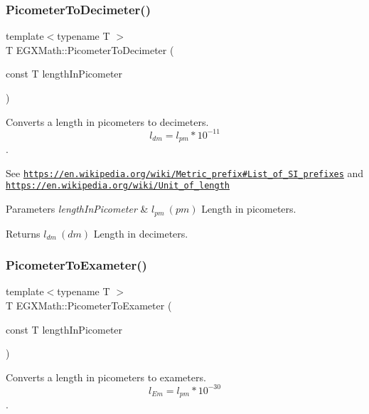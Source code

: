 \subsubsection{\texorpdfstring{Picometer\+To\+Decimeter()}{PicometerToDecimeter()}}
{\footnotesize\ttfamily template$<$typename T $>$ \\
T E\+G\+X\+Math\+::\+Picometer\+To\+Decimeter (\begin{DoxyParamCaption}\item[{const T}]{length\+In\+Picometer }\end{DoxyParamCaption})}



Converts a length in picometers to decimeters. \[ l_{dm}=l_{pm} * 10^{-11} \]. 

See \href{https://en.wikipedia.org/wiki/Metric_prefix#List_of_SI_prefixes}{\tt https\+://en.\+wikipedia.\+org/wiki/\+Metric\+\_\+prefix\#\+List\+\_\+of\+\_\+\+S\+I\+\_\+prefixes} and \href{https://en.wikipedia.org/wiki/Unit_of_length}{\tt https\+://en.\+wikipedia.\+org/wiki/\+Unit\+\_\+of\+\_\+length} 
\begin{DoxyParams}{Parameters}
{\em length\+In\+Picometer} & $ l_{pm}\ (pm)$ Length in picometers. \\
\hline
\end{DoxyParams}
\begin{DoxyReturn}{Returns}
$ l_{dm}\ (dm)$ Length in decimeters. 
\end{DoxyReturn}
\mbox{\label{group___e_g_x_math-_conversions-_length_conversions-_s_i-_picometer-_s_i_gaa62371decac9806280c05abaffc3b460}} 
\subsubsection{\texorpdfstring{Picometer\+To\+Exameter()}{PicometerToExameter()}}
{\footnotesize\ttfamily template$<$typename T $>$ \\
T E\+G\+X\+Math\+::\+Picometer\+To\+Exameter (\begin{DoxyParamCaption}\item[{const T}]{length\+In\+Picometer }\end{DoxyParamCaption})}



Converts a length in picometers to exameters. \[ l_{Em}=l_{pm} * 10^{-30} \]. 

